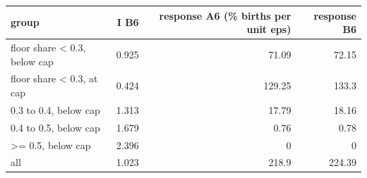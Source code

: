 \begin{tabular}{lrrr}
\toprule
group & I B6 & response A6 (\% births per unit eps) & response B6 \\
\midrule
floor share < 0.3, below cap & 0.925 & 71.09 & 72.15 \\
floor share < 0.3, at cap & 0.424 & 129.25 & 133.3 \\
0.3 to 0.4, below cap & 1.313 & 17.79 & 18.16 \\
0.4 to 0.5, below cap & 1.679 & 0.76 & 0.78 \\
>= 0.5, below cap & 2.396 & 0 & 0 \\
all & 1.023 & 218.9 & 224.39 \\
\bottomrule
\end{tabular}
